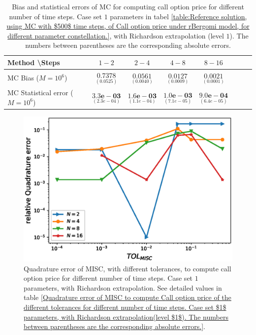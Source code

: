 \begin{table}[h!]
	\centering
	\begin{tabular}{l*{6}{c}r}
		Method \textbackslash  Steps            & $1-2$ & $2-4$ & $4-8$ & $8-16$  \\
		\hline
		MC  Bias ($M=10^6$)    &$\underset{( 0.0525)}{\mathbf{0.7378}}$  & $\underset{(    0.0040)}{\mathbf{0.0561}}$  & $\underset{(0.0009 )}{\mathbf{0.0127}}$  & $\underset{(0.0001)}{\mathbf{0.0021}}$ \\	
		
		MC Statistical error ($M=10^6$)   & $\underset{( 2.3e-04)}{\mathbf{3.3e-03}}$  & $\underset{(  1.1e-04)}{\mathbf{1.6e-03}}$  & $\underset{(7.1e-05)}{\mathbf{1.0e-03}}$ & $\underset{(   6.4e-05 )}{\mathbf{9.0e-04}}$ \\	
		
		
		\hline
	\end{tabular}
	\caption{Bias and statistical errors of MC   for computing call option price  for different number of time steps. Case set $1$ parameters in tabel \ref{table:Reference solution, using MC with $500$ time steps, of Call option price under rBergomi model, for different parameter constellation.}, with Richardson extrapolation (level $1$). The numbers between parentheses are the corresponding absolute errors.}
	\label{Bias and Statistical errors of MC ($M=10^6$)  for computing Call option price  for different number of time steps. Case set $1$ parameters, with Richardson extrapolation (level1). The numbers between parentheses are the corresponding absolute errors.}
\end{table}








\begin{figure}[h!]
	\centering
	\includegraphics[width=0.5\linewidth]{./figures/rBergomi_MISC_quadratre_error/vs_TOL/set1/relative_quad_error_wrt_MISC_TOL_set1_with_rich}
	
	
	\caption{Quadrature error of MISC, with different tolerances, to compute call option price for different number of time steps. Case  set $1$ parameters, with Richardson extrapolation.  See detailed values  in table \ref{Quadrature error of MISC to compute Call option price of the different tolerances for different number of time steps. Case set $1$ parameters, with Richardson extrapolation(level $1$). The numbers between parentheses are the corresponding absolute errors.}.}
\end{figure}




